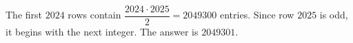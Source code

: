 The first $2024$ rows contain $\dfrac{2024\cdot2025}{2}=2049300$ entries. Since row $2025$ is odd, it begins with the next integer. The answer is $\boxed{2049301}$.
